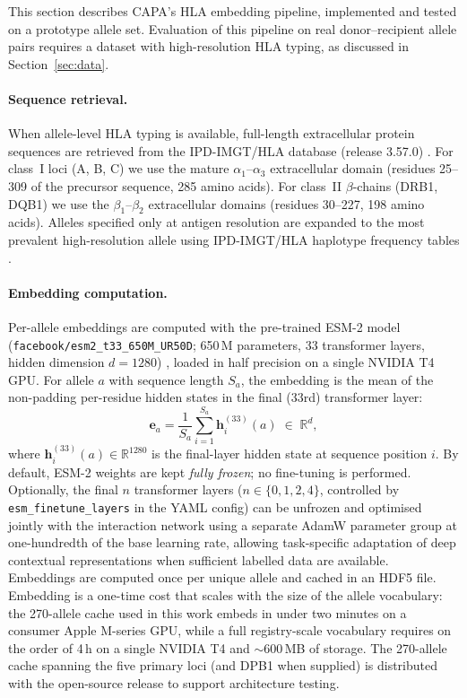 \documentclass[11pt,a4paper]{article}
\begin{document}
This section describes CAPA's HLA embedding pipeline, implemented and tested
on a prototype allele set.  Evaluation of this pipeline on real donor--recipient
allele pairs requires a dataset with high-resolution HLA typing, as discussed
in Section~\ref{sec:data}.

\paragraph{Sequence retrieval.}
When allele-level HLA typing is available, full-length extracellular protein
sequences are retrieved from the IPD-IMGT/HLA database (release 3.57.0)
\citep{barker2023ipdimgt}.  For class~I loci (A, B, C) we
use the mature $\alpha_1$--$\alpha_3$ extracellular domain (residues 25--309
of the precursor sequence, 285 amino acids).  For class~II $\beta$-chains
(DRB1, DQB1) we use the $\beta_1$--$\beta_2$ extracellular domains (residues
30--227, 198 amino acids).  Alleles specified only at antigen resolution
are expanded to the most prevalent high-resolution allele using
IPD-IMGT/HLA haplotype frequency tables \citep{maiers2007hlafreq}.

\paragraph{Embedding computation.}
Per-allele embeddings are computed with the pre-trained ESM-2 model
(\texttt{facebook/esm2\_t33\_650M\_UR50D}; 650\,M parameters, 33 transformer
layers, hidden dimension $d = 1280$) \citep{lin2023esm2}, loaded in half
precision on a single NVIDIA T4 GPU.  For allele $a$ with sequence length
$S_a$, the embedding is the mean of the non-padding per-residue hidden states
in the final (33rd) transformer layer:
\begin{equation}
  \mathbf{e}_a = \frac{1}{S_a} \sum_{i=1}^{S_a}
    \mathbf{h}^{(33)}_i(a)
    \;\in\; \mathbb{R}^{d},
  \label{eq:esm_pool}
\end{equation}
where $\mathbf{h}^{(33)}_i(a) \in \mathbb{R}^{1280}$ is the final-layer hidden
state at sequence position $i$.  By default, ESM-2 weights are kept \emph{fully frozen}; no fine-tuning is
performed.  Optionally, the final $n$ transformer layers ($n \in \{0,1,2,4\}$,
controlled by \texttt{esm\_finetune\_layers} in the YAML config) can be
unfrozen and optimised jointly with the interaction network using a separate
AdamW parameter group at one-hundredth of the base learning rate, allowing
task-specific adaptation of deep contextual representations when sufficient
labelled data are available.  Embeddings are computed once per unique allele
and cached in an HDF5 file.  Embedding is a one-time cost that scales with the
size of the allele vocabulary: the 270-allele cache used in this work embeds in
under two minutes on a consumer Apple M-series GPU, while a full registry-scale
vocabulary requires on the order of 4\,h on a single NVIDIA T4 and $\sim$600\,MB
of storage.  The 270-allele cache spanning the five primary loci (and DPB1 when
supplied) is distributed with the open-source release to support architecture
testing.
\end{document}
